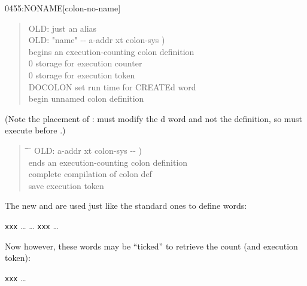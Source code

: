 \begin{worddef}{0455}{:NONAME}[colon-no-name]
\begin{defer}
\begin{quote}
\begin{tabbing}
			\word{:} OLD: \word{:} \word{;}								\>\>\>  just an alias \\[1.5\parskip]

			OLD: \word{:}  "name" -{}- a-addr xt colon-sys ) \\
			\+  begins an execution-counting colon definition \\
				  0 \word{,}					\>\>  storage for execution counter \\
				0 \word{,}												\>\>  storage for execution token \\
				DOCOLON													\>\>  set run time for CREATEd word \\
			\-												\>\>  begin unnamed colon definition \\
			\word{;}
		  \end{tabbing}
		\end{quote}

		(Note the placement of :  must modify
		the d word and not the  definition,
		so  must execute before .)

		\begin{quote}\ttfamily
		  \begin{tabbing}
			\tab \= \tab \= \hspace*{12em} \= \kill
			OLD: \word{;}  a-addr xt colon-sys -{}- ) \\
			\+  ends an execution-counting colon definition \\
				 \word{;}										\>\>  complete compilation of colon def \\
			\-	  \word{!}								\>\>  save execution token \\
			\word{;} 
		  \end{tabbing}
		\end{quote}

		The new \word{:} and \word{;} are used just like the standard
		ones to define words:

		\tab {\ldots} \word{:} \texttt{xxx} {\ldots} \word{;}
			{\ldots} \texttt{xxx} {\ldots}

		Now however, these words may be ``ticked'' to retrieve the
		count (and execution token):

		\tab {\ldots}  \texttt{xxx}   {\ldots}
	\end{defer}
\end{worddef}


